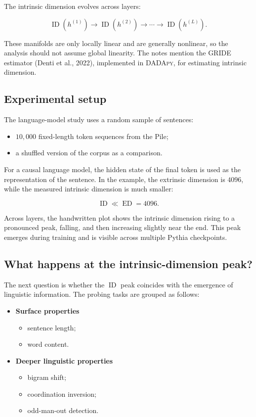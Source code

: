 \documentclass[11pt,a4paper]{article}
\newcommand{\ID}{\operatorname{ID}}
\newcommand{\ED}{\operatorname{ED}}
\begin{document}
The intrinsic dimension evolves across layers:

\[
  \ID\!\left(h^{(1)}\right)
  \longrightarrow
  \ID\!\left(h^{(2)}\right)
  \longrightarrow \cdots \longrightarrow
  \ID\!\left(h^{(L)}\right).
\]

These manifolds are only locally linear and are generally nonlinear, so the
analysis should not assume global linearity. The notes mention the
\textsc{GRIDE} estimator (Denti et al., 2022), implemented in
\textsc{DADApy}, for estimating intrinsic dimension.

\subsection{Experimental setup}

The language-model study uses a random sample of sentences:

\begin{itemize}
  \item $10{,}000$ fixed-length token sequences from the Pile;
  \item a shuffled version of the corpus as a comparison.
\end{itemize}

For a causal language model, the hidden state of the final token is used as the
representation of the sentence. In the example, the extrinsic dimension is
$4096$, while the measured intrinsic dimension is much smaller:

\[
  \ID \ll \ED = 4096.
\]

Across layers, the handwritten plot shows the intrinsic dimension rising to a
pronounced peak, falling, and then increasing slightly near the end. This peak
emerges during training and is visible across multiple Pythia checkpoints.

\subsection{What happens at the intrinsic-dimension peak?}

The next question is whether the $\ID$ peak coincides with the emergence of
linguistic information. The probing tasks are grouped as follows:

\begin{itemize}
  \item \textbf{Surface properties}
    \begin{itemize}
      \item sentence length;
      \item word content.
    \end{itemize}
  \item \textbf{Deeper linguistic properties}
    \begin{itemize}
      \item bigram shift;
      \item coordination inversion;
      \item odd-man-out detection.
    \end{itemize}
\end{itemize}
\end{document}
